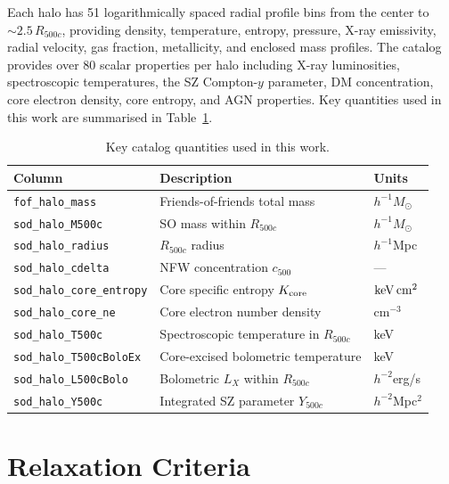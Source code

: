 \documentclass[12pt]{article}
\newcommand{\Rfive}{R_{500c}}
\newcommand{\Kcore}{K_{\rm core}}
\newcommand{\kevcm}{{\rm keV\,cm^2}}
\newcommand{\Msun}{M_\odot}
\begin{document}
Each halo has 51 logarithmically spaced radial profile bins from the center to
$\sim 2.5\,\Rfive$, providing density, temperature, entropy, pressure, X-ray emissivity,
radial velocity, gas fraction, metallicity, and enclosed mass profiles.
The catalog provides over 80 scalar properties per halo including X-ray luminosities,
spectroscopic temperatures, the SZ Compton-$y$ parameter, DM concentration, core electron
density, core entropy, and AGN properties.  Key quantities used in this work are
summarised in Table~\ref{tab:catalog_cols}.

\begin{table}[htbp]
\centering
\caption{Key catalog quantities used in this work.}
\label{tab:catalog_cols}
\begin{tabular}{lll}
\toprule
Column & Description & Units \\
\midrule
\texttt{fof\_halo\_mass}          & Friends-of-friends total mass              & $h^{-1}\Msun$    \\
\texttt{sod\_halo\_M500c}         & SO mass within $R_{500c}$                  & $h^{-1}\Msun$    \\
\texttt{sod\_halo\_radius}        & $R_{500c}$ radius                          & $h^{-1}$Mpc      \\
\texttt{sod\_halo\_cdelta}        & NFW concentration $c_{500}$                & ---              \\
\texttt{sod\_halo\_core\_entropy} & Core specific entropy $\Kcore$             & $\kevcm$         \\
\texttt{sod\_halo\_core\_ne}      & Core electron number density               & cm$^{-3}$        \\
\texttt{sod\_halo\_T500c}         & Spectroscopic temperature in $R_{500c}$    & keV              \\
\texttt{sod\_halo\_T500cBoloEx}   & Core-excised bolometric temperature        & keV              \\
\texttt{sod\_halo\_L500cBolo}     & Bolometric $L_X$ within $R_{500c}$        & $h^{-2}$erg/s    \\
\texttt{sod\_halo\_Y500c}         & Integrated SZ parameter $Y_{500c}$        & $h^{-2}$Mpc$^2$  \\
\bottomrule
\end{tabular}
\end{table}

\FloatBarrier
\section{Relaxation Criteria}
\label{sec:criteria}
\end{document}

